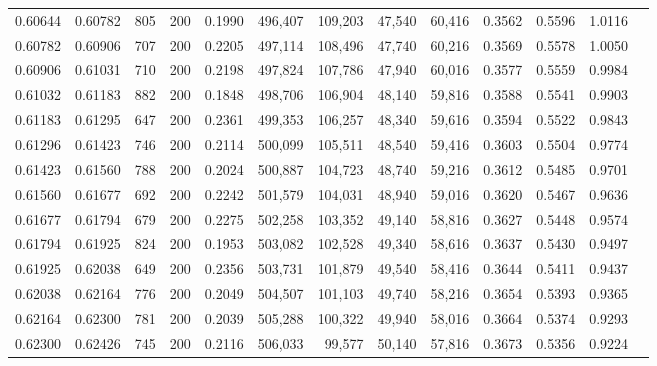 \begin{tabular}{rrrrrrrrrrrrr}
0.60644 & 0.60782 &    805 & 200 &                                     0.1990 & 496,407 & 109,203 &  47,540 &  60,416 & 0.3562 & 0.5596 & 1.0116 \\
0.60782 & 0.60906 &    707 & 200 &                                     0.2205 & 497,114 & 108,496 &  47,740 &  60,216 & 0.3569 & 0.5578 & 1.0050 \\
0.60906 & 0.61031 &    710 & 200 &                                     0.2198 & 497,824 & 107,786 &  47,940 &  60,016 & 0.3577 & 0.5559 & 0.9984 \\
0.61032 & 0.61183 &    882 & 200 &                                     0.1848 & 498,706 & 106,904 &  48,140 &  59,816 & 0.3588 & 0.5541 & 0.9903 \\
0.61183 & 0.61295 &    647 & 200 &                                     0.2361 & 499,353 & 106,257 &  48,340 &  59,616 & 0.3594 & 0.5522 & 0.9843 \\
0.61296 & 0.61423 &    746 & 200 &                                     0.2114 & 500,099 & 105,511 &  48,540 &  59,416 & 0.3603 & 0.5504 & 0.9774 \\
0.61423 & 0.61560 &    788 & 200 &                                     0.2024 & 500,887 & 104,723 &  48,740 &  59,216 & 0.3612 & 0.5485 & 0.9701 \\
0.61560 & 0.61677 &    692 & 200 &                                     0.2242 & 501,579 & 104,031 &  48,940 &  59,016 & 0.3620 & 0.5467 & 0.9636 \\
0.61677 & 0.61794 &    679 & 200 &                                     0.2275 & 502,258 & 103,352 &  49,140 &  58,816 & 0.3627 & 0.5448 & 0.9574 \\
0.61794 & 0.61925 &    824 & 200 &                                     0.1953 & 503,082 & 102,528 &  49,340 &  58,616 & 0.3637 & 0.5430 & 0.9497 \\
0.61925 & 0.62038 &    649 & 200 &                                     0.2356 & 503,731 & 101,879 &  49,540 &  58,416 & 0.3644 & 0.5411 & 0.9437 \\
0.62038 & 0.62164 &    776 & 200 &                                     0.2049 & 504,507 & 101,103 &  49,740 &  58,216 & 0.3654 & 0.5393 & 0.9365 \\
0.62164 & 0.62300 &    781 & 200 &                                     0.2039 & 505,288 & 100,322 &  49,940 &  58,016 & 0.3664 & 0.5374 & 0.9293 \\
0.62300 & 0.62426 &    745 & 200 &                                     0.2116 & 506,033 &  99,577 &  50,140 &  57,816 & 0.3673 & 0.5356 & 0.9224 \\

\end{tabular}
